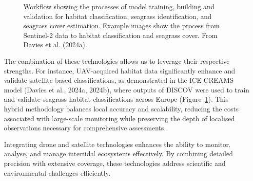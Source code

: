\documentclass[
  letterpaper,
  11pt,
  english,
  singlespacing,
  headsepline]{MastersDoctoralThesis}
\begin{document}
\begin{spacing}{1.5}
\begin{figure}


\caption{\label{fig-WorkflowBede}Workflow showing the processes of model
training, building and validation for habitat classification, seagrass
identification, and seagrass cover estimation. Example images show the
process from Sentinel-2 data to habitat classification and seagrass
cover. From Davies et al. (2024a).}

\end{figure}%

The combination of these technologies allows us to leverage their
respective strengths. For instance, UAV-acquired habitat data
significantly enhance and validate satellite-based classifications, as
demonstrated in the ICE CREAMS model (Davies et al., 2024a, 2024b),
where outputs of DISCOV were used to train and validate seagrass habitat
classifications across Europe (Figure~\ref{fig-WorkflowBede}). This
hybrid methodology balances local accuracy and scalability, reducing the
costs associated with large-scale monitoring while preserving the depth
of localised observations necessary for comprehensive assessments.

Integrating drone and satellite technologies enhances the ability to
monitor, analyse, and manage intertidal ecosystems effectively. By
combining detailed precision with extensive coverage, these technologies
address scientific and environmental challenges efficiently.


\end{spacing}
\end{document}
